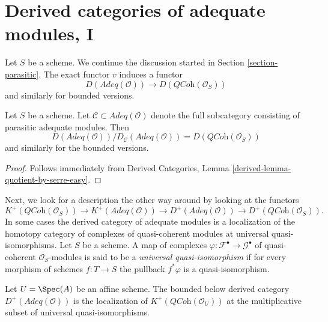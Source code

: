 \section{Derived categories of adequate modules, I}
\label{section-comparison}


\noindent
Let $S$ be a scheme. We continue the discussion started in
Section \ref{section-parasitic}.
The exact functor $v$ induces a functor
$$
D(\textit{Adeq}(\mathcal{O}))
\longrightarrow
D(\textit{QCoh}(\mathcal{O}_S))
$$
and similarly for bounded versions.

\begin{lemma}
\label{lemma-quotient-easy}
Let $S$ be a scheme. Let
$\mathcal{C} \subset \textit{Adeq}(\mathcal{O})$ denote the
full subcategory consisting of parasitic adequate modules.
Then
$$
D(\textit{Adeq}(\mathcal{O}))/D_\mathcal{C}(\textit{Adeq}(\mathcal{O}))
= D(\textit{QCoh}(\mathcal{O}_S))
$$
and similarly for the bounded versions.
\end{lemma}

\begin{proof}
Follows immediately from
Derived Categories, Lemma \ref{derived-lemma-quotient-by-serre-easy}.
\end{proof}

\noindent
Next, we look for a description the other way around by looking at
the functors
$$
K^+(\textit{QCoh}(\mathcal{O}_S))
\longrightarrow
K^+(\textit{Adeq}(\mathcal{O}))
\longrightarrow
D^+(\textit{Adeq}(\mathcal{O}))
\longrightarrow
D^+(\textit{QCoh}(\mathcal{O}_S)).
$$
In some cases the derived category of adequate modules is a localization
of the homotopy category of complexes of quasi-coherent modules at
universal quasi-isomorphisms. Let $S$ be a scheme. A map of complexes
$\varphi : \mathcal{F}^\bullet \to \mathcal{G}^\bullet$
of quasi-coherent $\mathcal{O}_S$-modules is said to be a
{\it universal quasi-isomorphism} if for every morphism of schemes
$f : T \to S$ the pullback $f^*\varphi$ is a quasi-isomorphism.

\begin{lemma}
\label{lemma-describe-Dplus-adequate}
Let $U = \Spec(A)$ be an affine scheme.
The bounded below derived category
$D^+(\textit{Adeq}(\mathcal{O}))$ is the localization
of $K^+(\textit{QCoh}(\mathcal{O}_U))$ at the multiplicative subset of
universal quasi-isomorphisms.
\end{lemma}

